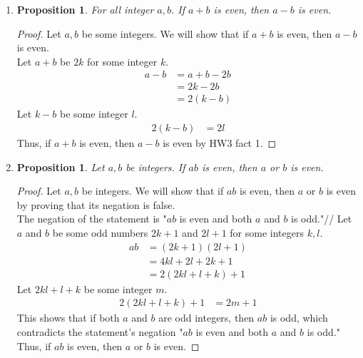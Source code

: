\documentclass{article}
\newtheorem{prop}[thm]{Proposition}
\begin{document}
\begin{enumerate}
\item \begin{prop}
    For all integer $a, b$.  If $a + b$ is even, then $a - b$ is even.
\end{prop}
\begin{proof}
Let $a, b$ be some integers. We will show that if $a + b$ is even, then $a - b$ is even. \\
Let $a + b$ be $2k$ for some integer $k$.
\begin{align}
    a - b &= a + b - 2b \\ 
    &= 2k - 2b \\
    &= 2(k - b)
\end{align}
Let $k - b$ be some integer $l$.
\begin{align}
    2(k - b) &= 2l
\end{align}
Thus, if $a + b$ is even, then $a - b$ is even by HW3 fact 1.
\end{proof}

\item \begin{prop}
    Let $a, b$ be integers. If $ab$ is even, then $a$ or $b$ is even.
\end{prop}

\begin{proof}
Let $a, b$ be integers. We will show that if $ab$ is even, then $a$ or $b$ is even by proving that its negation is false. \\
The negation of the statement is "$ab$ is even and both $a$ and $b$ is odd."//
Let $a$ and $b$ be some odd numbers $2k + 1$ and $2l + 1$ for some integers $k, l$.
\begin{align}
    ab &= (2k + 1)(2l + 1) \\
    &= 4kl + 2l + 2k + 1 \\
    &= 2(2kl + l + k) + 1
\end{align}
Let $2kl + l + k$ be some integer $m$.
\begin{align}
    2(2kl + l + k) + 1 &= 2m + 1
\end{align}
This shows that if both $a$ and $b$ are odd integers, then $ab$ is odd, which contradicts the statement's negation "$ab$ is even and both $a$ and $b$ is odd." Thus, if $ab$ is even, then $a$ or $b$ is even.
\end{proof}

    
\end{enumerate}
\end{document}
